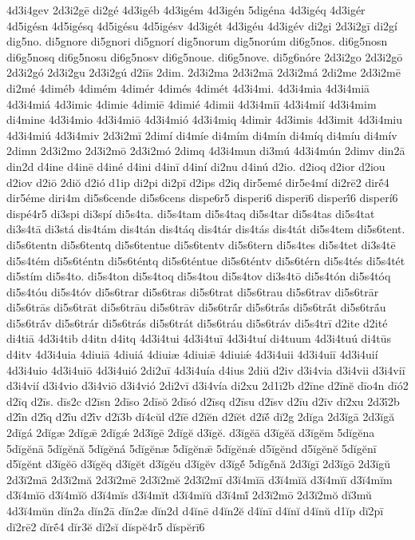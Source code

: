 {4d3i4gev
2d3i2gē
di2gé
4d3igéb
4d3igém
4d3igén
5digéna
4d3igéq
4d3igér
4d5igésn
4d5igésq
4d5igésu
4d5igésv
4d3igét
4d3igéu
4d3igév
di2gi
2d3i2gī
di2gí
dig5no.
di5gnore
di5gnori
di5gnorí
dig5norum
dig5norúm
di6g5nos.
di6g5nosn
di6g5nosq
di6g5nosu
di6g5nosv
di6g5noue.
di6g5nove.
di5g6nóre
2d3i2go
2d3i2gō
2d3i2gó
2d3i2gu
2d3i2gú
d2iīs
2dim.
2d3i2ma
2d3i2mā
2d3i2má
2di2me
2d3i2mē
di2mé
4diméb
4dimém
4dimér
4dimés
4dimét
4d3i4mi.
4d3i4mia
4d3i4miā
4d3i4miá
4d3imic
4dimie
4dimiē
4dimié
4dimii
4d3i4miī
4d3i4mií
4d3i4mim
di4mine
4d3i4mio
4d3i4miō
4d3i4mió
4d3i4miq
4dimir
4d3imis
4d3imit
4d3i4miu
4d3i4miú
4d3i4miv
2d3i2mī
2dimí
di4míe
di4mím
di4mín
di4míq
di4míu
di4mív
2dimn
2d3i2mo
2d3i2mō
2d3i2mó
2dimq
4d3i4mun
di3mú
4d3i4mún
2dimv
din2ā
din2d
d4ine
d4inē
d4iné
d4ini
d4inī
d4iní
di2nu
d4inú
d2io.
d2ioq
d2ior
d2iou
d2iov
d2iō
2diŏ
d2ió
d1ip
di2pi
di2pī
d2ips
d2iq
dir5emé
dir5e4mí
di2rē2
dirḗ4
dir5éme
diri4m
di5s6cende
di5s6cens
dispe6r5
disperi6
disperī6
disperī́6
disperí6
dispé4r5
di3spi
di3spí
di5s4ta.
di5s4tam
di5s4taq
di5s4tar
di5s4tas
di5s4tat
di3s4tā
di3stá
dis4tám
dis4tán
dis4táq
dis4tár
dis4tás
dis4tát
di5s4tem
di5s6tent.
di5s6tentn
di5s6tentq
di5s6tentue
di5s6tentv
di5s6tern
di5s4tes
di5s4tet
di3s4tē
di5s4tém
di5s6téntn
di5s6téntq
di5s6téntue
di5s6téntv
di5s6térn
di5s4tés
di5s4tét
di5stím
di5s4to.
di5s4ton
di5s4toq
di5s4tou
di5s4tov
di3s4tō
di5s4tón
di5s4tóq
di5s4tóu
di5s4tóv
di5s6trar
di5s6tras
di5s6trat
di5s6trau
di5s6trav
di5s6trār
di5s6trās
di5s6trāt
di5s6trāu
di5s6trāv
di5s6trā́r
di5s6trā́s
di5s6trā́t
di5s6trā́u
di5s6trā́v
di5s6trár
di5s6trás
di5s6trát
di5s6tráu
di5s6tráv
di5s4trī
d2ite
d2ité
di4tiā
4d3i4tib
d4itn
d4itq
4d3i4tui
4d3i4tuī
4d3i4tuí
di4tuum
4d3i4tuú
di4tūs
d4itv
4d3i4uia
4diuiā
4diuiá
4diuiæ
4diuiǣ
4diuiǽ
4d3i4uii
4d3i4uiī
4d3i4uií
4d3i4uio
4d3i4uiō
4d3i4uió
2di2uī
4d3i4uía
d4ius
2diŭ
d2iv
d3i4via
d3i4vii
d3i4viī
d3i4vií
d3i4vio
d3i4viō
d3i4vió
2di2vī
d3i4vía
di2xu
2d1ī2b
d2īne
d2īnĕ
dīo4n
dīó2
d2īq
d2īs.
dīs2c
d2īsn
2dīso
2dīsŏ
2dīsó
d2īsq
d2īsu
d2īsv
d2īu
d2īv
dī2xu
2d3ī́2b
d2ī́n
d2ī́q
d2ī́u
d2ī́v
d2ĭ3b
dĭ4cŭl
d2ĭē
d2ĭĕn
d2ĭĕt
d2ĭĕ́
dĭ2g
2dĭga
2d3ĭgā
2d3ĭgă
2dĭgá
2dĭgæ
2dĭgǣ
2dĭgǽ
2d3ĭgē
2dĭgĕ
d3ĭgĕ.
d3ĭgĕā
d3ĭgĕă
d3ĭgĕm
5dĭgĕna
5dĭgĕnā
5dĭgĕnă
5dĭgĕná
5dĭgĕnæ
5dĭgĕnǣ
5dĭgĕnǽ
d5ĭgĕnd
d5ĭgĕnĕ
5dĭgĕnī
d5ĭgĕnt
d3ĭgĕō
d3ĭgĕq
d3ĭgĕt
d3ĭgĕu
d3ĭgĕv
d3ĭgĕ́
5dĭgĕ́nă
2d3ĭgī
2d3ĭgō
2d3ĭgŭ
2d3ĭ2mā
2d3ĭ2mă
2d3ĭ2mē
2d3ĭ2mĕ
2d3ĭ2mī
d3ĭ4mĭā
d3ĭ4mĭă
d3ĭ4mĭī
d3ĭ4mĭm
d3ĭ4mĭō
d3ĭ4mĭŏ
d3ĭ4mĭs
d3ĭ4mĭt
d3ĭ4mĭŭ
d3ĭ4mĭ́
2d3ĭ2mō
2d3ĭ2mŏ
dĭ3mŭ
4d3ĭ4mŭn
dĭn2a
dĭn2ā
dĭn2æ
dĭn2d
d4ĭnē
d4ĭn2ĕ
d4ĭnī
d4ĭnĭ
d4ĭnŭ
d1ĭp
dĭ2pī
dĭ2rē2
dĭrḗ4
dĭr3ĕ
dĭ2sĭ
dĭspĕ4r5
dĭspĕrī6
}
